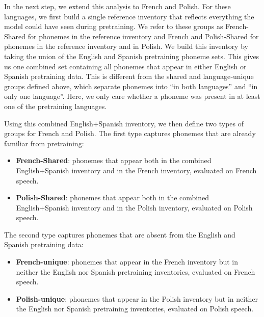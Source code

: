 In the next step, we extend this analysis to French and Polish. For these languages, we first build a single reference inventory that reflects everything the model could have seen during pretraining. We refer to these groups as French-Shared for phonemes in the reference inventory and French and Polish-Shared for phonemes in the reference inventory and in Polish. We build this inventory by taking the union of the English and Spanish pretraining phoneme sets. This gives us one combined set containing all phonemes that appear in either English or Spanish pretraining data. This is different from the shared and language‑unique groups defined above, which separate phonemes into “in both languages” and “in only one language”. Here, we only care whether a phoneme was present in at least one of the pretraining languages.

Using this combined English+Spanish inventory, we then define two types of groups for French and Polish. The first type captures phonemes that are already familiar from pretraining:
\begin{itemize}
    \item  \textbf{French-Shared}: phonemes that appear both in the combined English+Spanish inventory and in the French inventory, evaluated on French speech.
    \item  \textbf{Polish-Shared}: phonemes that appear both in the combined English+Spanish inventory and in the Polish inventory, evaluated on Polish speech.
\end{itemize}
The second type captures phonemes that are absent from the English and Spanish pretraining data:
\begin{itemize}
    \item \textbf{French-unique}: phonemes that appear in the French inventory but in neither the English nor Spanish pretraining inventories, evaluated on French speech.
    \item \textbf{Polish-unique}: phonemes that appear in the Polish inventory but in neither the English nor Spanish pretraining inventories, evaluated on Polish speech.
\end{itemize}


